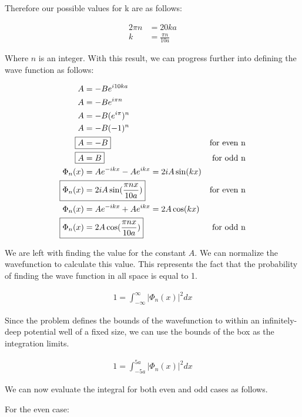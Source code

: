 \documentclass[10pt, oneside, letterpaper]{article}
\begin{document}
Therefore our possible values for k are as follows:

\begin{align*}
  2\pi n &= 20ka \\
  k &= \frac{\pi n}{10a}
\end{align*}

Where $n$ is an integer. With this result, we can progress further into defining the wave function as follows:

\begin{align*}
  A &= -Be^{i10ka} \\
  A &= -Be^{i\pi n} \\
  A &= -B(e^{i\pi})^n \\
  A &= -B(-1)^n \\
  \Aboxed{A &= -B} & \text{for even n} \\
  \Aboxed{A &= B} & \text{for odd n} \\
  \Phi_n(x) &= Ae^{-ikx} - Ae^{ikx} = 2iA\sin(kx) \\
  \Aboxed{\Phi_n(x) &= 2iA\sin(\frac{\pi nx}{10a})} &\text{for even n} \\
  \Phi_n(x) &= Ae^{-ikx} + Ae^{ikx} = 2A\cos(kx) \\
  \Aboxed{\Phi_n(x) &= 2A\cos(\frac{\pi nx}{10a})} &\text{for odd n}
\end{align*}

We are left with finding the value for the constant $A$. We can normalize the wavefunction to calculate this value. This represents the fact that the probability of finding the wave function in all space is equal to 1.

\begin{align*}
  1 = \int_{-\infty}^{\infty}\left|\Phi_n(x)\right|^2dx
\end{align*}

Since the problem defines the bounds of the wavefunction to within an infinitely-deep potential well of a fixed size, we can use the bounds of the box as the integration limits.

\begin{align*}
  1 = \int_{-5a}^{5a}\left|\Phi_n(x)\right|^2dx
\end{align*}

We can now evaluate the integral for both even and odd cases as follows.

For the even case:
\end{document}
